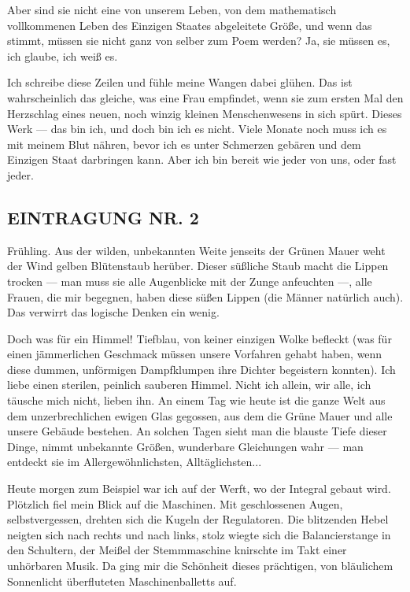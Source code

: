 Aber sind sie nicht eine von unserem Leben, von dem mathematisch
vollkommenen Leben des Einzigen Staates abgeleitete Größe, und wenn
das stimmt, müssen sie nicht ganz von selber zum Poem werden? Ja,
sie müssen es, ich glaube, ich weiß es.

Ich schreibe diese Zeilen und fühle meine Wangen dabei glühen. Das
ist wahrscheinlich das gleiche, was eine Frau empfindet, wenn sie
zum ersten Mal den Herzschlag eines neuen, noch winzig kleinen
Menschenwesens in sich spürt. Dieses Werk — das bin ich, und doch
bin ich es nicht. Viele Monate noch muss ich es mit meinem Blut
nähren, bevor ich es unter Schmerzen gebären und dem Einzigen Staat
darbringen kann. Aber ich bin bereit wie jeder von uns, oder fast
jeder.

\subsection{EINTRAGUNG NR. 2}

Frühling. Aus der wilden, unbekannten Weite jenseits der Grünen
Mauer weht der Wind gelben Blütenstaub herüber. Dieser süßliche
Staub macht die Lippen trocken — man muss sie alle Augenblicke mit
der Zunge anfeuchten —, alle Frauen, die mir begegnen, haben diese
süßen Lippen (die Männer natürlich auch). Das verwirrt das logische
Denken ein wenig.

Doch was für ein Himmel! Tiefblau, von keiner einzigen Wolke
befleckt (was für einen jämmerlichen Geschmack müssen unsere
Vorfahren gehabt haben, wenn diese dummen, unförmigen Dampfklumpen
ihre Dichter begeistern konnten). Ich liebe einen sterilen,
peinlich sauberen Himmel. Nicht ich allein, wir alle, ich täusche
mich nicht, lieben ihn. An einem Tag wie heute ist die ganze Welt
aus dem unzerbrechlichen ewigen Glas gegossen, aus dem die Grüne
Mauer und alle unsere Gebäude bestehen. An solchen Tagen sieht man
die blauste Tiefe dieser Dinge, nimmt unbekannte Größen, wunderbare
Gleichungen wahr — man entdeckt sie im Allergewöhnlichsten,
Alltäglichsten...

Heute morgen zum Beispiel war ich auf der Werft, wo der Integral
gebaut wird. Plötzlich fiel mein Blick auf die Maschinen. Mit
geschlossenen Augen, selbstvergessen, drehten sich die Kugeln der
Regulatoren. Die blitzenden Hebel neigten sich nach rechts und nach
links, stolz wiegte sich die Balancierstange in den Schultern, der
Meißel der Stemmmaschine knirschte im Takt einer unhörbaren Musik.
Da ging mir die Schönheit dieses prächtigen, von bläulichem
Sonnenlicht überfluteten Maschinenballetts auf.

